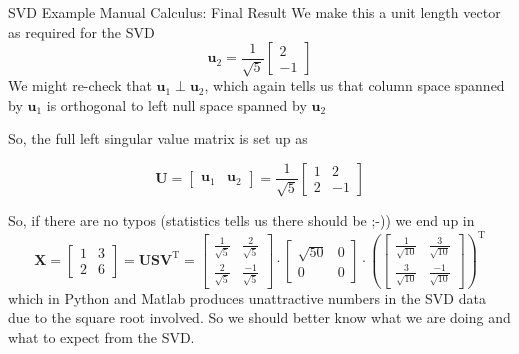 \documentclass[mathserif, aspectratio=1610]{intbeamer}
\begin{document}
\begin{frame}[t]{SVD Example Manual Calculus: Final Result}
We make this a unit length vector as required for the SVD
$$
\bm{u}_2 = \frac{1}{\sqrt{5}}\begin{bmatrix}2\\-1\end{bmatrix}
$$
We might re-check that $\bm{u}_1 \perp \bm{u}_2$, which again tells us
that column space spanned by $\bm{u}_1$ is orthogonal to left null space spanned by $\bm{u}_2$

So, the full left singular value matrix is set up as


$$
\bm{U} =
\begin{bmatrix}
\bm{u}_1 & \bm{u}_2
\end{bmatrix}=
\frac{1}{\sqrt{5}}
\begin{bmatrix}
1 & 2\\
2 & -1
\end{bmatrix}
$$

So, if there are no typos (statistics tells us there should be ;-))
we end up in
$$
\bm{X}
=
\begin{bmatrix}
1 & 3\\
2 & 6
\end{bmatrix}
= \bm{U} \bm{S} \bm{V}^\mathrm{T}=
\begin{bmatrix}
\frac{1}{\sqrt{5}} & \frac{2}{\sqrt{5}}\\
\frac{2}{\sqrt{5}} & \frac{-1}{\sqrt{5}}
\end{bmatrix}
\cdot
\begin{bmatrix}
\sqrt{50} & 0\\
0 & 0
\end{bmatrix}
\cdot
\left(
\begin{bmatrix}
\frac{1}{\sqrt{10}} & \frac{3}{\sqrt{10}} \\
\frac{3}{\sqrt{10}} & \frac{-1}{\sqrt{10}}
\end{bmatrix}
\right)^\mathrm{T}
$$
which in Python and Matlab produces unattractive numbers in the SVD data due to the square root involved.
So we should better know what we are doing and what to expect from the SVD.
\end{frame}
%
%
%
















\end{document}
